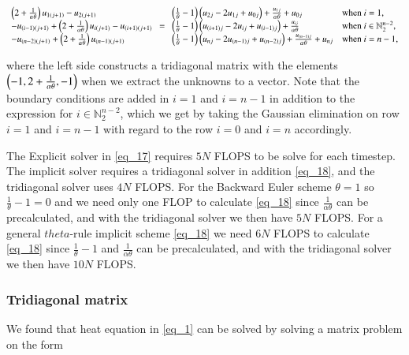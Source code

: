 \documentclass[11pt,english,a4paper]{article}
\begin{document}
\begin{flushleft}
\begin{align}
\begin{array}{l} \left({2+\frac{1}{\alpha \theta}}\right)u_{1(j+1)} - u_{2(j+1)} \\  -u_{(i-1)(j+1)} +\left({2+\frac{1}{\alpha \theta}}\right)u_{i(j+1)} - u_{(i+1)(j+1)} \\ -u_{(n-2)(j+1)} +\left({2+\frac{1}{\alpha \theta}}\right)u_{(n-1)(j+1)} \end{array} = \begin{array}{ll} \left({\frac{1}{\theta}-1}\right)\left({u_{2j} - 2u_{1j} + u_{0j}}\right) + \frac{u_{1j}}{\alpha\theta} + u_{0j} & \text{when $i=1$,} \\ \left({\frac{1}{\theta}-1}\right)\left({u_{(i+1)j} - 2u_{ij} + u_{(i-1)j}}\right) + \frac{u_{ij}}{\alpha\theta} & \text{when $i\in\mathbb{N}_2^{n-2}$,}\\ \left({\frac{1}{\theta}-1}\right)\left({u_{nj} - 2u_{(n-1)j} + u_{(n-2)j}}\right) + \frac{u_{(n-1)j}}{\alpha\theta} + u_{nj} & \text{when $i=n-1$,}\end{array}
\label{eq_18}
\end{align}

where the left side constructs a tridiagonal matrix with the elements $\left({-1,2+\frac{1}{\alpha\theta},-1}\right)$ when we extract the unknowns to a vector. Note that the boundary conditions are added in $i=1$ and $i=n-1$  in addition to the expression for $i\in\mathbb{N}_2^{n-2}$, which we get by taking the Gaussian elimination on row $i=1$ and $i=n-1$ with regard to the row $i=0$ and $i=n$ accordingly. \linebreak

The Explicit solver in \eqref{eq_17} requires $5N$ FLOPS to be solve for each timestep. The implicit solver requires a tridiagonal solver in addition \eqref{eq_18}, and the tridiagonal solver uses $4N$ FLOPS. For the Backward Euler scheme $\theta = 1$ so $\frac{1}{\theta}-1=0$ and we need only one FLOP to calculate \eqref{eq_18} since $\frac{1}{\alpha \theta}$ can be precalculated, and with the tridiagonal solver we then have $5N$ FLOPS. For a general $theta$-rule implicit scheme \eqref{eq_18} we need $6N$ FLOPS to calculate \eqref{eq_18} since $\frac{1}{\theta}-1$ and $\frac{1}{\alpha \theta}$ can be precalculated, and with the tridiagonal solver we then have $10N$ FLOPS.

\subsubsection{Tridiagonal matrix}

We found that heat equation in \eqref{eq_1} can be solved by solving a matrix problem on the form


\end{flushleft}
\end{document}
